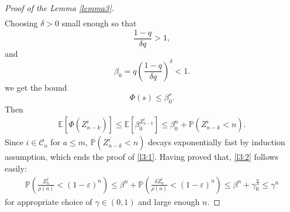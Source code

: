 \documentclass[10pt,a4paper]{amsart}
\begin{document}
\begin{proof}[Proof of the Lemma \ref{lemma3}]
\begin{align*}
 \end{align*}
 Choosing $\delta > 0$ small enough so that \[
 \frac {1-q} {\delta q} > 1,\] and \[
 \beta_0 = q \left(\frac {1-q} {\delta q}\right)^{\delta} < 1.
 \]we get the bound 
 \[
 \Phi(s) \leq \beta_0^s.
 \]
Then 
     \begin{align*}
    \mathbb{E} \left[\Phi\left(Z_{n-k}^i\right)\right] \leq \mathbb{E}\left[\beta_0^{Z_{n-k}^i} \right] \leq \beta_0^n + \mathbb{P}\left(Z_{n-k}^i< n\right).
    \end{align*}
    Since $i \in \mathcal{C}_a$ for $a \leq m$, $\mathbb{P}\left(Z_{n-k}^i< n\right)$ decays exponentially fast by induction assumption, which ends the proof of \eqref{l3:1}. Having proved that, \eqref{l3:2} follows easily:
    \begin{align*}
        \mathbb{P}\left(\frac {Z_{n}^j} {\rho(a)}< (1-\varepsilon)^n\right) \leq \beta^n + \mathbb{P}\left(\frac {\delta Z_{n}^i} {\rho(a)}< (1-\varepsilon)^n\right)  \leq \beta^n + \gamma_0^{\frac n {\delta}} \leq \gamma^n
    \end{align*}
    for appropriate choice of $\gamma \in (0,1)$ and large enough $n$.
    \end{proof}    
\end{document}
